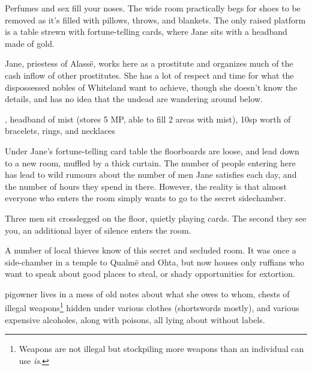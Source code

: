 \begin{multicols}{2}


\begin{boxtext}
	Perfumes and sex fill your noses.  The wide room practically begs for shoes to be removed as it's filled with pillows, throws, and blankets.  The only raised platform is a table strewn with fortune-telling cards, where Jane sits with a headband made of gold.
\end{boxtext}

Jane, priestess of Alass\"{e}, works here as a prostitute and organizes much of the cash inflow of other prostitutes.  She has a lot of respect and time for what the dispossessed nobles of Whiteland want to achieve, though she doesn't know the details, and has no idea that the undead are wandering around below.


%
{\Dagger, headband of mist (stores 5 MP, able to fill 2 areas with mist), 10sp worth of bracelets, rings, and necklaces}%
{}

Under Jane's fortune-telling card table the floorboards are loose, and lead down to a new room, muffled by a thick curtain.  The number of people entering here has lead to wild rumours about the number of men Jane satisfies each day, and the number of hours they spend in there.  However, the reality is that almost everyone who enters the room simply wants to go to the secret sidechamber.


\begin{boxtext}
	Three men sit crosslegged on the floor, quietly playing cards.  The second they see you, an additional layer of silence enters the room.
\end{boxtext}

A number of local thieves know of this secret and secluded room.  It was once a side-chamber in a temple to Qualm\"{e} and Ohta, but now houses only ruffians who want to speak about good places to steal, or shady opportunities for extortion.


\humanthief


\Gls{pigowner} lives in a mess of old notes about what she owes to whom, chests of illegal weapons\footnote{Weapons are not illegal but stockpiling more weapons than an individual can use \emph{is}.} hidden under various clothes (shortswords mostly), and various expensive alcoholes, along with poisons, all lying about without labels.


\end{multicols}
